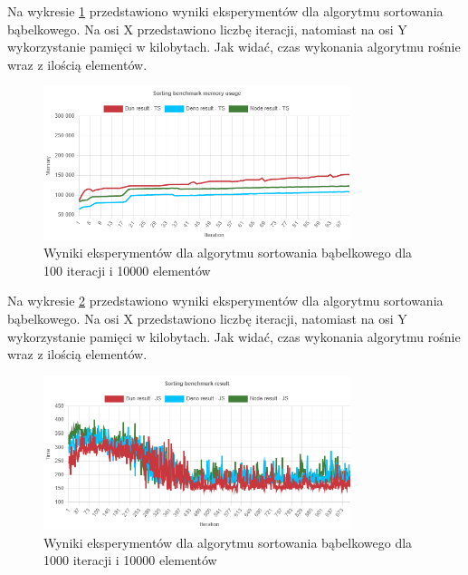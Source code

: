 Na wykresie \ref{fig:quick_sorting_e5_memory_ts} przedstawiono wyniki eksperymentów dla algorytmu sortowania bąbelkowego. Na osi X przedstawiono liczbę iteracji, natomiast na osi Y wykorzystanie pamięci w kilobytach. Jak widać, czas wykonania algorytmu rośnie wraz z ilością elementów.
\begin{figure}[H]
  \centering
  \includegraphics[width=0.8\textwidth]{Figures/sorting/quick/e5_memory_ts.png}
  \caption{Wyniki eksperymentów dla algorytmu sortowania bąbelkowego dla 100 iteracji i 10000 elementów}
  \label{fig:quick_sorting_e5_memory_ts}
\end{figure}

Na wykresie \ref{fig:quick_sorting_e6} przedstawiono wyniki eksperymentów dla algorytmu sortowania bąbelkowego. Na osi X przedstawiono liczbę iteracji, natomiast na osi Y wykorzystanie pamięci w kilobytach. Jak widać, czas wykonania algorytmu rośnie wraz z ilością elementów.
\begin{figure}[H]
  \centering
  \includegraphics[width=0.8\textwidth]{Figures/sorting/quick/e6_js.png}
  \caption{Wyniki eksperymentów dla algorytmu sortowania bąbelkowego dla 1000 iteracji i 10000 elementów}
  \label{fig:quick_sorting_e6}
\end{figure}

